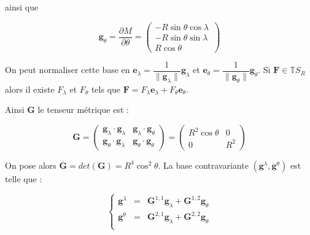 ainsi que 

\begin{equation}
\mathbf{g}_{\theta} = \dfrac{\partial M}{\partial \theta} = \begin{pmatrix}
- R \sin \theta \cos \lambda \\ 
- R \sin \theta \sin \lambda \ \\ 
R \cos \theta
\end{pmatrix} 
\end{equation}

\begin{remarque}
On peut normaliser cette base en $\mathbf{e}_{\lambda} = \dfrac{1}{\| \mathbf{g}_{\lambda} \|} \mathbf{g}_{\lambda}$ et $\mathbf{e}_{\theta} = \dfrac{1}{\| \mathbf{g}_{\theta} \|} \mathbf{g}_{\theta}$. Si $\mathbf{F} \in \mathbb{T}S_R$ alors il existe $F_{\lambda}$ et $F_{\theta}$ tels que $\mathbf{F} = F_{\lambda} \mathbf{e}_{\lambda} + F_{\theta} \mathbf{e}_{\theta}$.
\end{remarque}

Ainsi $\mathbf{G}$ le tenseur métrique est :

\begin{equation}
\mathbf{G} = 
\begin{pmatrix}
\mathbf{g}_{\lambda} \cdot \mathbf{g}_{\lambda} & \mathbf{g}_{\lambda} \cdot \mathbf{g}_{\theta} \\
\mathbf{g}_{\theta} \cdot \mathbf{g}_{\lambda} & \mathbf{g}_{\theta} \cdot \mathbf{g}_{\theta}
\end{pmatrix}
 =
\begin{pmatrix}
R^2 \cos \theta & 0 \\
0 & R^2
\end{pmatrix}
\end{equation}

On pose alors $\overline{\mathbf{G}} = det (\mathbf{G}) = R^4 \cos^2 \theta$. La base contravariante $( \mathbf{g}^{\lambda}, \mathbf{g}^{\theta} ) $ est telle que :

\begin{equation}
\left\lbrace 
\begin{array}{rcl}
\mathbf{g}^{\lambda} & = & \mathbf{G}^{1,1} \mathbf{g}_{\lambda} + \mathbf{G}^{1,2} \mathbf{g}_{\theta} \\
\mathbf{g}^{\theta} & = & \mathbf{G}^{2,1} \mathbf{g}_{\lambda} + \mathbf{G}^{2,2} \mathbf{g}_{\theta} \\
\end{array}
\right.
\end{equation}

